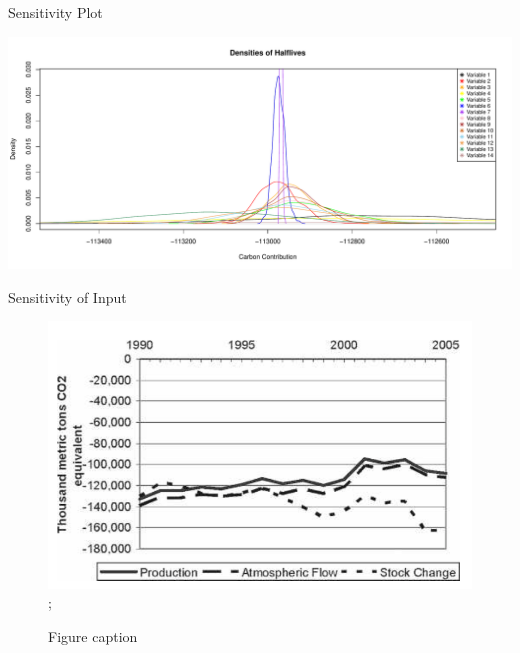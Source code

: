\documentclass[final]{beamer}\usepackage[]{graphicx}\usepackage[]{color}
\makeatletter
\def\maxwidth{ %
  \ifdim\Gin@nat@width>\linewidth
    \linewidth
  \else
    \Gin@nat@width
  \fi
}
\newenvironment{knitrout}{}{} %
\newlength{\onecolwid}
\newlength{\twocolwid}
\makeatother
\begin{document}
\begin{frame}[t]
\begin{columns}[t]
\begin{column}{\twocolwid}
\begin{columns}[t,totalwidth=\twocolwid]
\begin{column}{\onecolwid}
\begin{block}{Sensitivity Plot}
\begin{knitrout}
\color{fgcolor}

{\centering \includegraphics[width=\maxwidth]{figure/unnamed-chunk-1-1} 

}



\end{knitrout}

\end{block}
\begin{block}{Sensitivity of Input}
\begin{center}

\begin{figure}
    {\includegraphics[width=1\linewidth]{graph1.png}};
    \caption{Figure caption}
\end{figure}
\end{center}
\end{block}



\end{column}
\end{columns}
\end{column}
\end{columns}
\end{frame}
\end{document}
